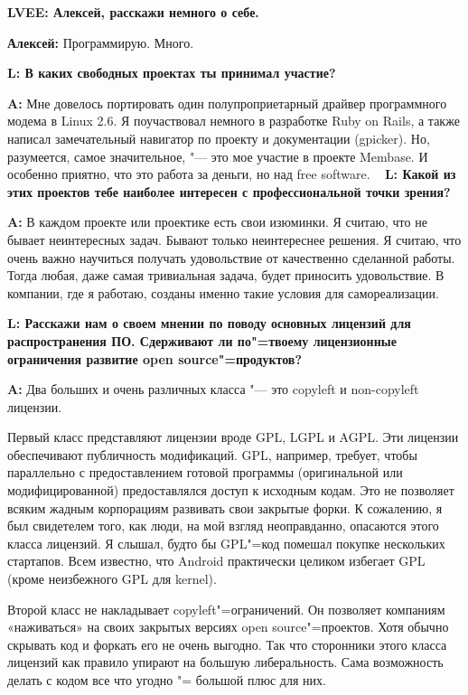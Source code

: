 \documentclass[10pt, a5paper]{article}
\begin{document}
{\noindent \bf LVEE: Алексей, расскажи немного о себе.}

{\noindent \bf Алексей:} Программирую. Много.

{\noindent \bf L:  В каких свободных проектах ты принимал участие?}

{\noindent \bf A:} Мне довелось портировать один полупроприетарный драйвер программного модема в Linux 2.6. Я поучаствовал немного в разработке Ruby on Rails, а также написал замечательный навигатор по проекту и документации (gpicker). Но, разумеется, самое значительное, "--- это  мое участие в проекте Membase. И особенно приятно, что это работа за деньги, но над free software.
 
{\noindent \bf L:  Какой из этих проектов тебе наиболее интересен с профессиональной точки зрения?}

{\noindent \bf A:} В каждом проекте или проектике есть свои изюминки. Я считаю, что не бывает неинтересных задач. Бывают только неинтереснее решения. Я считаю, что очень важно научиться получать удовольствие от качественно сделанной работы. Тогда любая, даже самая тривиальная задача, будет приносить удовольствие. В компании, где я работаю, созданы именно такие условия для самореализации.

{\noindent \bf L:  Расскажи нам о своем мнении по поводу основных лицензий для распространения ПО. Сдерживают ли по"=твоему лицензионные ограничения развитие open source"=продуктов?}

{\noindent \bf A:} Два больших и очень различных класса "--- это copyleft и non-copyleft лицензии.

Первый класс представляют лицензии вроде GPL, LGPL и AGPL. Эти лицензии обеспечивают публичность модификаций. GPL, например, требует, чтобы параллельно с предоставлением готовой программы (оригинальной или модифицированной) предоставлялся доступ к исходным кодам. Это не позволяет всяким жадным корпорациям развивать свои закрытые форки. К сожалению, я был свидетелем того, как люди,  на мой взгляд неоправданно, опасаются этого класса лицензий. Я слышал, будто бы GPL"=код помешал покупке нескольких стартапов. Всем известно, что Android практически целиком избегает GPL (кроме неизбежного GPL для kernel).

Второй класс не накладывает copyleft"=ограничений. Он позволяет компаниям «наживаться» на своих закрытых версиях open source"=проектов. Хотя обычно скрывать код и форкать его не очень выгодно. Так что сторонники этого класса лицензий как правило упирают на большую либеральность. Сама возможность делать с кодом все что угодно "= большой плюс для них.
\end{document}
